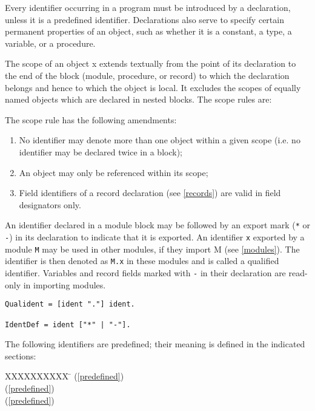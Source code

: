 \documentclass[12pt]{article}
\begin{document}
Every identifier occurring in a program must be introduced by a declaration, unless it is a predefined identifier. Declarations also serve to specify certain permanent properties of an object, such as whether it is a constant, a type, a variable, or a procedure.

The scope of an object x extends textually from the point of its declaration to the end of the block (module, procedure, or record) to which the declaration belongs and hence to which the object is local. It excludes the scopes of equally named objects which are declared in nested blocks. The scope rules are:

The scope rule has the following amendments:
\begin{enumerate}
    \item No identifier may denote more than one object within a given scope (i.e. no identifier may be declared twice in a block);
    \item An object may only be referenced within its scope;
    \item Field identifiers of a record declaration (see \ref{records}) are valid in field designators only.
\end{enumerate}

An identifier declared in a module block may be followed by an export mark (\lstinline!*! or \lstinline!-!) in its declaration to indicate that it is exported. An identifier \lstinline!x! exported by a module \lstinline!M! may be used in other modules, if they import M (see \ref{modules}). The identifier is then denoted as \lstinline!M.x! in these modules and is called a qualified identifier. Variables and record fields marked with \lstinline!-! in their declaration are read-only in importing modules.

\begin{lstlisting}[style=ebnf]
Qualident = [ident "."] ident. 

IdentDef = ident ["*" | "-"].
\end{lstlisting}

The following identifiers are predefined; their meaning is defined in the indicated sections:
\begin{tabbing}
    XXXXXXXXXX \= \kill
    \WriteInt \> (\ref{predefined}) \\
    \WriteBoolean \> (\ref{predefined}) \\
    \WriteLn \> (\ref{predefined}) \\
\end{tabbing}
\end{document}

